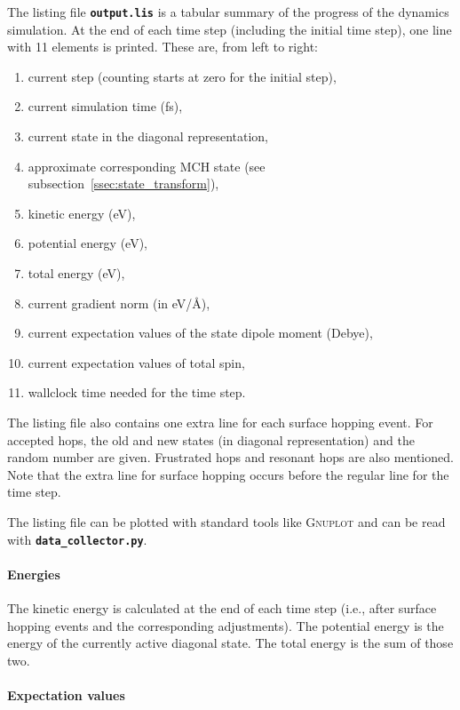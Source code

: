 \documentclass[a4paper,10pt,DIV=15,openany]{scrbook}
\newcommand{\ttt}[1]{\textbf{\texttt{#1}}}
\begin{document}
The listing file \ttt{output.lis} is a tabular summary of the progress of the dynamics simulation. At the end of each time step (including the initial time step), one line with 11 elements is printed. These are, from left to right:
\begin{enumerate}
  \item current step (counting starts at zero for the initial step),
  \item current simulation time (fs),
  \item current state in the diagonal representation,
  \item approximate corresponding MCH state (see subsection~\ref{ssec:state_transform}),
  \item kinetic energy (eV),
  \item potential energy (eV),
  \item total energy (eV),
  \item current gradient norm (in eV/\AA),
  \item current expectation values of the state dipole moment (Debye),
  \item current expectation values of total spin,
  \item wallclock time needed for the time step.
\end{enumerate}
The listing file also contains one extra line for each surface hopping event. For accepted hops, the old and new states (in diagonal representation) and the random number are given. Frustrated hops and resonant hops are also mentioned. Note that the extra line for surface hopping occurs before the regular line for the time step. 

The listing file can be plotted with standard tools like \textsc{Gnuplot} and can be read with \ttt{data\_collector.py}. 

\paragraph{Energies}

The kinetic energy is calculated at the end of each time step (i.e., after surface hopping events and the corresponding adjustments). The potential energy is the energy of the currently active diagonal state. The total energy is the sum of those two.

\paragraph{Expectation values}
\end{document}

